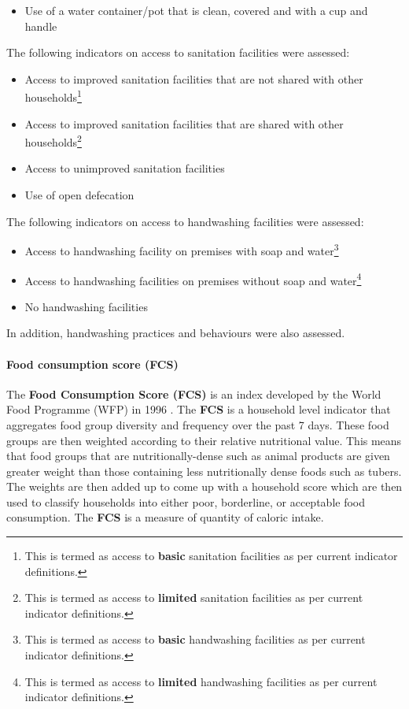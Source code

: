 \documentclass[12pt,a4paper]{article}
\providecommand{\tightlist}{%
  \setlength{\itemsep}{0pt}\setlength{\parskip}{0pt}}
\let\oldparagraph\paragraph
\renewcommand{\paragraph}[1]{\oldparagraph{#1}\mbox{}}
\let\rmarkdownfootnote\footnote%
\def\footnote{\protect\rmarkdownfootnote}
\begin{document}
\begin{itemize}
\tightlist
\item
  Use of a water container/pot that is clean, covered and with a cup and handle
\end{itemize}

The following indicators on access to sanitation facilities were assessed:

\begin{itemize}
\item
  Access to improved sanitation facilities that are not shared with other households\footnote{This is termed as access to \textbf{basic} sanitation facilities as per current indicator definitions.}
\item
  Access to improved sanitation facilities that are shared with other households\footnote{This is termed as access to \textbf{limited} sanitation facilities as per current indicator definitions.}
\item
  Access to unimproved sanitation facilities
\item
  Use of open defecation
\end{itemize}

The following indicators on access to handwashing facilities were assessed:

\begin{itemize}
\item
  Access to handwashing facility on premises with soap and water\footnote{This is termed as access to \textbf{basic} handwashing facilities as per current indicator definitions.}
\item
  Access to handwashing facilities on premises without soap and water\footnote{This is termed as access to \textbf{limited} handwashing facilities as per current indicator definitions.}
\item
  No handwashing facilities
\end{itemize}

In addition, handwashing practices and behaviours were also assessed.

\hypertarget{fcs}{%
\paragraph{Food consumption score (FCS)}\label{fcs}}

The \textbf{Food Consumption Score (FCS)} is an index developed by the World Food Programme (WFP) in 1996 \citep{VulnerabilityAssessmentandMappingWorldFoodProgramme:2008ti}. The \textbf{FCS} is a household level indicator that aggregates food group diversity and frequency over the past 7 days. These food groups are then weighted according to their relative nutritional value. This means that food groups that are nutritionally-dense such as animal products are given greater weight than those containing less nutritionally dense foods such as tubers. The weights are then added up to come up with a household score which are then used to classify households into either poor, borderline, or acceptable food consumption. The \textbf{FCS} is a measure of quantity of caloric intake.
\end{document}

